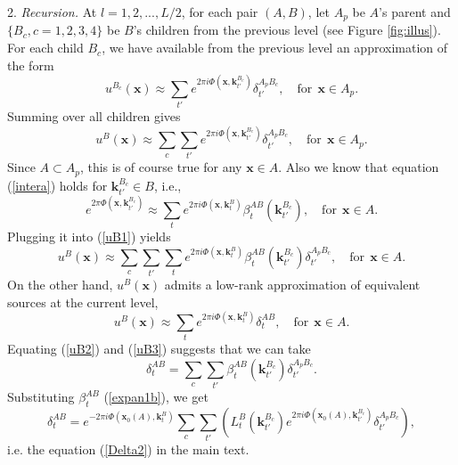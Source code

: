 2. {\it Recursion.} At $l=1,2,...,L/2$, for each pair $(A,B)$, let $A_p$ be $A$'s parent and $\{B_c, c=1,2,3,4\}$ be $B$'s children from the previous level (see Figure \ref{fig:illus}). For each child $B_c$, we have available from the previous level an approximation of the form 
\begin{equation}
u^{B_c}(\mathbf{x})\approx  
\sum_{t'} e^{2\pi i
  \Phi(\mathbf{x},\mathbf{k}_{t'}^{B_c})}\delta_{t'}^{A_pB_c}, \quad
 \text{for} \ \ \mathbf{x}\in A_p.
\end{equation}
Summing over all children gives
\begin{equation} \label{uB1}
u^{B}(\mathbf{x})\approx  
\sum_c \sum_{t'}  e^{2\pi i
  \Phi(\mathbf{x},\mathbf{k}_{t'}^{B_c})}\delta_{t'}^{A_pB_c}, \quad
 \text{for} \ \ \mathbf{x}\in A_p.
\end{equation} 
Since $A\subset A_p$, this is of course true for any $\mathbf{x}\in A$. Also we know that equation (\ref{intera}) holds for $\mathbf{k}_{t'}^{B_c}\in B$, i.e.,
\begin{equation}
e^{2\pi \Phi(\mathbf{x},\mathbf{k}_{t'}^{B_c})}\approx\sum_t e^{2\pi i
    \Phi(\mathbf{x},\mathbf{k}_t^B)}\beta_t^{AB}(\mathbf{k}_{t'}^{B_c}), \quad
  \text{for} \ \ \mathbf{x}\in A.
\end{equation}
Plugging it into (\ref{uB1}) yields
\begin{equation} \label{uB2}
u^{B}(\mathbf{x})\approx  
\sum_c \sum_{t'} \sum_t e^{2\pi i
    \Phi(\mathbf{x},\mathbf{k}_t^B)}\beta_t^{AB}(\mathbf{k}_{t'}^{B_c})\delta_{t'}^{A_pB_c}, \quad
 \text{for} \ \ \mathbf{x}\in A.
\end{equation} 
On the other hand, $u^B(\mathbf{x})$ admits a low-rank approximation of equivalent sources at the current level,
\begin{equation} \label{uB3}
u^{B}(\mathbf{x})\approx  
\sum_t  e^{2\pi i
  \Phi(\mathbf{x},\mathbf{k}_{t}^{B})}\delta_{t}^{AB}, \quad
 \text{for} \ \ \mathbf{x}\in A.
\end{equation}
Equating (\ref{uB2}) and (\ref{uB3}) suggests that we can take
\begin{equation} \label{mdelta1}
\delta_t^{AB}=\sum_c\sum_{t'}\beta_t^{AB}(\mathbf{k}_{t'}^{B_c})\delta_{t'}^{A_pB_c}.
\end{equation}
Substituting $\beta_t^{AB}$ (\ref{expan1b}), we get
\begin{equation} \label{delta2}
\delta_t^{AB}=e^{-2\pi i
  \Phi(\mathbf{x}_0(A),\mathbf{k}_t^B)}\sum_c\sum_{t'}
\left(L_t^B(\mathbf{k}_{t'}^{B_c})e^{2\pi i
  \Phi(\mathbf{x}_0(A),\mathbf{k}_{t'}^{B_c})}\delta_{t'}^{A_pB_c}\right),
\end{equation}
i.e. the equation (\ref{Delta2}) in the main text.

